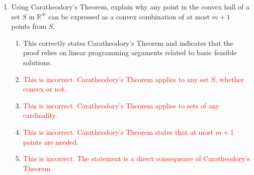 \documentclass{article}%
\newcommand{\incorrect}[1]{\textcolor{red}{#1}}
\begin{document}
\begin{enumerate}
\begin{enumerate}
\begin{enumerate}%
\item This explanation correctly uses the definition of the convex hull as the intersection of all convex sets containing $S$ to argue that it is the smallest such set.  Any smaller convex set would leave out points of $S$.%
\item \incorrect{This is incorrect. The convex hull is the smallest, not the largest, convex set containing $S$.}%
\item \incorrect{This is incorrect. The definition of the convex hull applies to sets of any cardinality.}%
\item \incorrect{This is incorrect. The convex hull is, by definition, a convex set.}%
\item \incorrect{This is incorrect. The concept of "smallest" is well-defined for sets in terms of set inclusion.}%
\end{enumerate}%
\vspace{0.5em}%
\item Using Caratheodory's Theorem, explain why any point in the convex hull of a set $S$ in $\mathbb{R}^m$ can be expressed as a convex combination of at most $m+1$ points from $S$.%
\begin{enumerate}%
\item This correctly states Caratheodory's Theorem and indicates that the proof relies on linear programming arguments related to basic feasible solutions.%
\item \incorrect{This is incorrect. Caratheodory's Theorem applies to any set $S$, whether convex or not.}%
\item \incorrect{This is incorrect. Caratheodory's Theorem applies to sets of any cardinality.}%
\item \incorrect{This is incorrect. Caratheodory's Theorem states that at most $m+1$ points are needed.}%
\item \incorrect{This is incorrect. The statement is a direct consequence of Caratheodory's Theorem.}%
\end{enumerate}%
\vspace{0.5em}%
\end{enumerate}%
\end{enumerate}

%
\end{document}
